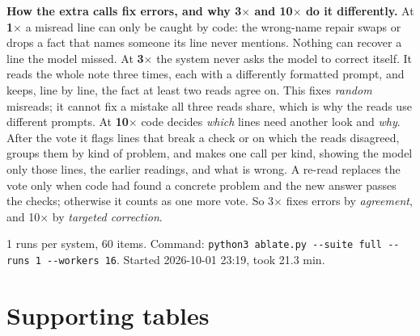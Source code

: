 \documentclass[10pt]{article}
\begin{document}
\textbf{How the extra calls fix errors, and why 3$\times$ and 10$\times$ do it differently.}
At \textbf{1$\times$} a misread line can only be caught by code: the wrong-name repair swaps or drops a fact that names someone its line never mentions. Nothing can recover a line the model missed.
At \textbf{3$\times$} the system never asks the model to correct itself. It reads the whole note three times, each with a differently formatted prompt, and keeps, line by line, the fact at least two reads agree on. This fixes \emph{random} misreads; it cannot fix a mistake all three reads share, which is why the reads use different prompts.
At \textbf{10$\times$} code decides \emph{which} lines need another look and \emph{why}. After the vote it flags lines that break a check or on which the reads disagreed, groups them by kind of problem, and makes one call per kind, showing the model only those lines, the earlier readings, and what is wrong. A re-read replaces the vote only when code had found a concrete problem and the new answer passes the checks; otherwise it counts as one more vote. So 3$\times$ fixes errors by \emph{agreement}, and 10$\times$ by \emph{targeted correction}.

{\footnotesize 1 runs per system, 60 items. Command: \texttt{python3 ablate.py -{}-suite full -{}-runs 1 -{}-workers 16}. Started 2026-10-01 23:19, took 21.3 min.}

\clearpage
\section*{Supporting tables}
\end{document}
